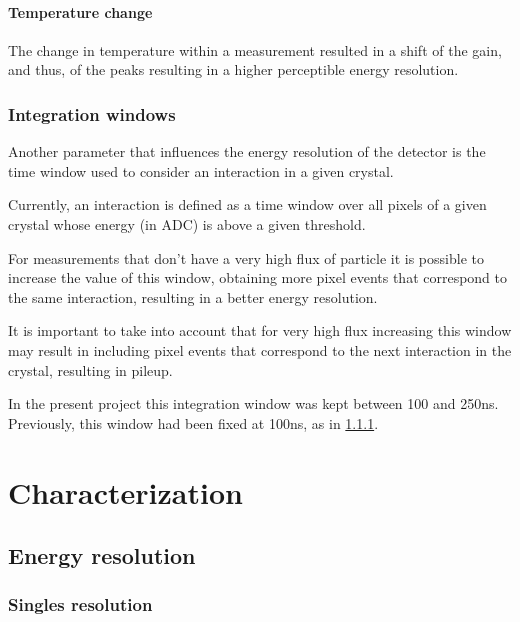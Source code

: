 \paragraph*{Temperature change}

The change in temperature within a measurement resulted in a shift of the gain, and thus, of the peaks resulting in a higher perceptible energy resolution.

\subsubsection{Integration windows}

Another parameter that influences the energy resolution of the detector is the time window used to consider an interaction in a given crystal.

Currently, an interaction is defined as a time window over all pixels of a given crystal whose energy (in ADC) is above a given threshold.

For measurements that don't have a very high flux of particle it is possible to increase the value of this window, obtaining more pixel events that correspond to the same interaction, resulting in a better energy resolution.

It is important to take into account that for very high flux increasing this window may result in including pixel events that correspond to the next interaction in the crystal, resulting in pileup.

In the present project this integration window was kept between 100 and 250ns. Previously, this window had been fixed at 100ns, as in \ref{}.

\section{Characterization}\label{sec:characterization}

\subsection{Energy resolution}

\subsubsection{Singles resolution}

